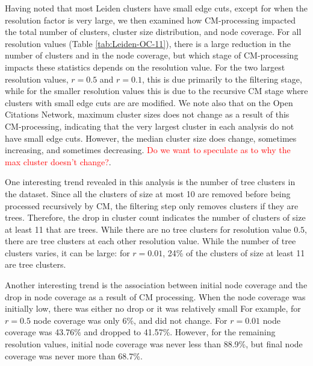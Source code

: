 \documentclass[11pt]{article}   	%
\begin{document}
Having noted that most Leiden clusters have small edge cuts, except for when the resolution factor is very large, we then examined how CM-processing impacted the total number of clusters, cluster size distribution, and node coverage.
For all resolution values (Table \ref{tab:Leiden-OC-11}), there is a large reduction in the number of clusters and in the node coverage, but which stage of CM-processing impacts these statistics depends on the resolution value.
For the  two largest resolution values, $r=0.5$ and $r=0.1$, this is
due primarily  to the filtering stage, while  for the smaller resolution values this is due to the recursive CM stage where clusters with small edge cuts are are modified.
We note also that on the Open Citations Network,  maximum cluster sizes does not change as a result of this CM-processing, indicating that the very largest cluster in each analysis  do not have small edge cuts.  However, the median cluster size does change, sometimes increasing,  and sometimes decreasing. \textcolor{red}{Do we want to speculate as to why the max cluster doesn't change?}.

One interesting trend revealed in this analysis is the number of tree clusters in the dataset.
Since all the clusters of size at most 10 are removed before being processed recursively by CM, the filtering step only removes clusters if they are trees.
Therefore, the drop in cluster count indicates the number of clusters of size at least 11 that are trees.
While there are no tree clusters for resolution value $0.5$,  there are tree clusters at each other resolution value.
While the number of tree clusters varies, it can be large:  for $r=0.01$, 24\% of the clusters of size at least 11 are tree clusters.

Another interesting trend is the association between initial node coverage and the drop in node coverage as a result of CM processing. When the node coverage was initially low, there was either no drop or it was relatively small For example, for $r=0.5$ node coverage was only 6\%, and did not change. For $r=0.01$ node coverage was 43.76\% and dropped to 41.57\%. However, for the remaining resolution values, initial node coverage was never less than 88.9\%, but final node coverage was never more than 68.7\%.
\end{document}
